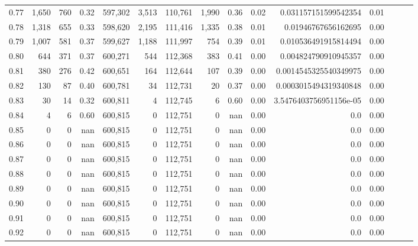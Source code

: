 \begin{tabular}{rrrrrrrrrrrrrrr}
0.77 &   1,650 &    760 &  0.32 &  597,302 &    3,513 &  110,761 &    1,990 &  0.36 &  0.02 &    0.031157151599542354 &      0.01 \\
0.78 &   1,318 &    655 &  0.33 &  598,620 &    2,195 &  111,416 &    1,335 &  0.38 &  0.01 &     0.01946767656162695 &      0.00 \\
0.79 &   1,007 &    581 &  0.37 &  599,627 &    1,188 &  111,997 &      754 &  0.39 &  0.01 &    0.010536491915814494 &      0.00 \\
0.80 &     644 &    371 &  0.37 &  600,271 &      544 &  112,368 &      383 &  0.41 &  0.00 &    0.004824790910945357 &      0.00 \\
0.81 &     380 &    276 &  0.42 &  600,651 &      164 &  112,644 &      107 &  0.39 &  0.00 &   0.0014545325540349975 &      0.00 \\
0.82 &     130 &     87 &  0.40 &  600,781 &       34 &  112,731 &       20 &  0.37 &  0.00 &   0.0003015494319340848 &      0.00 \\
0.83 &      30 &     14 &  0.32 &  600,811 &        4 &  112,745 &        6 &  0.60 &  0.00 &  3.5476403756951156e-05 &      0.00 \\
0.84 &       4 &      6 &  0.60 &  600,815 &        0 &  112,751 &        0 &   nan &  0.00 &                     0.0 &      0.00 \\
0.85 &       0 &      0 &   nan &  600,815 &        0 &  112,751 &        0 &   nan &  0.00 &                     0.0 &      0.00 \\
0.86 &       0 &      0 &   nan &  600,815 &        0 &  112,751 &        0 &   nan &  0.00 &                     0.0 &      0.00 \\
0.87 &       0 &      0 &   nan &  600,815 &        0 &  112,751 &        0 &   nan &  0.00 &                     0.0 &      0.00 \\
0.88 &       0 &      0 &   nan &  600,815 &        0 &  112,751 &        0 &   nan &  0.00 &                     0.0 &      0.00 \\
0.89 &       0 &      0 &   nan &  600,815 &        0 &  112,751 &        0 &   nan &  0.00 &                     0.0 &      0.00 \\
0.90 &       0 &      0 &   nan &  600,815 &        0 &  112,751 &        0 &   nan &  0.00 &                     0.0 &      0.00 \\
0.91 &       0 &      0 &   nan &  600,815 &        0 &  112,751 &        0 &   nan &  0.00 &                     0.0 &      0.00 \\
0.92 &       0 &      0 &   nan &  600,815 &        0 &  112,751 &        0 &   nan &  0.00 &                     0.0 &      0.00 \\

\end{tabular}
